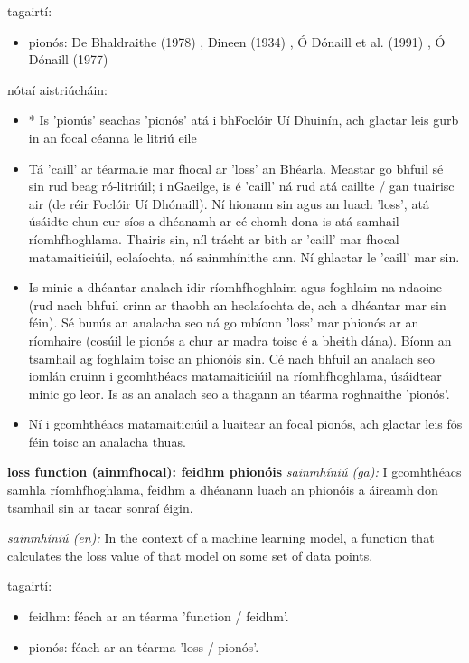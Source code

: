 \documentclass{article}
\begin{document}
tagairtí:
\begin{itemize}
	\item pionós: De Bhaldraithe (1978) \cite{de-bhaldraithe}, Dineen (1934) \cite{dineen}, Ó Dónaill et al. (1991) \cite{focloir-beag}, Ó Dónaill (1977) \cite{odonaill}
\end{itemize}

nótaí aistriúcháin:
\begin{itemize}
	\item * Is 'pionús' seachas 'pionós' atá i bhFoclóir Uí Dhuinín, ach glactar leis gurb in an focal céanna le litriú eile
	\item Tá 'caill' ar téarma.ie mar fhocal ar 'loss' an Bhéarla. Meastar go bhfuil sé sin rud beag ró-litriúil; i nGaeilge, is é 'caill' ná rud atá caillte / gan tuairisc air (de réir Foclóir Uí Dhónaill). Ní hionann sin agus an luach 'loss', atá úsáidte chun cur síos a dhéanamh ar cé chomh dona is atá samhail ríomhfhoghlama. Thairis sin, níl trácht ar bith ar 'caill' mar fhocal matamaiticiúil, eolaíochta, ná sainmhínithe ann. Ní ghlactar le 'caill' mar sin.
	\item Is minic a dhéantar analach idir ríomhfhoghlaim agus foghlaim na ndaoine (rud nach bhfuil crinn ar thaobh an heolaíochta de, ach a dhéantar mar sin féin). Sé bunús an analacha seo ná go mbíonn 'loss' mar phionós ar an ríomhaire (cosúil le pionós a chur ar madra toisc é a bheith dána). Bíonn an tsamhail ag foghlaim toisc an phionóis sin. Cé nach bhfuil an analach seo iomlán cruinn i gcomhthéacs matamaiticiúil na ríomhfhoghlama, úsáidtear minic go leor. Is as an analach seo a thagann an téarma roghnaithe 'pionós'.
	\item Ní i gcomhthéacs matamaiticiúil a luaitear an focal pionós, ach glactar leis fós féin toisc an analacha thuas.
\end{itemize}


\textbf{loss function (ainmfhocal): feidhm phionóis}
\textit{sainmhíniú (ga):} I gcomhthéacs samhla ríomhfhoghlama, feidhm a dhéanann luach an phionóis a áireamh don tsamhail sin ar tacar sonraí éigin.

\textit{sainmhíniú (en):} In the context of a machine learning model, a function that calculates the loss value of that model on some set of data points.

tagairtí:
\begin{itemize}
	\item feidhm: féach ar an téarma 'function / feidhm'.
	\item pionós: féach ar an téarma 'loss / pionós'.
\end{itemize}
\end{document}
